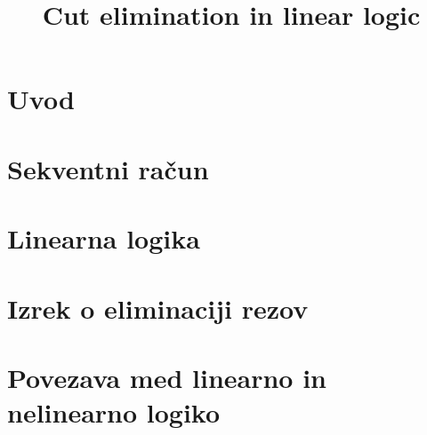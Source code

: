 \documentclass[mat1, tisk]{fmfdelo}
\title{Cut elimination in linear logic}
\begin{document}
\section{Uvod}


\section{Sekventni račun} \label{seq_calc}


\section{Linearna logika} \label{ll}


\section{Izrek o eliminaciji rezov} \label{ier}


\section{Povezava med linearno in nelinearno logiko} \label{cl v cll}

\end{document}

